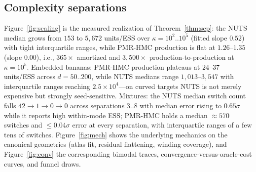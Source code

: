 \documentclass[11pt]{article}
\theoremstyle{remark}
\begin{document}
\subsection{Complexity separations}
Figure~\ref{fig:scaling} is the measured realization of
Theorem~\ref{thm:sep}: the NUTS median grows from $153$ to $5{,}672$
units/ESS over $\kappa=10^2..10^5$ (fitted slope $0.52$) with tight
interquartile ranges, while PMR-HMC production is flat at $1.26$--$1.35$
(slope $0.00$), i.e., $365\times$ amortized and $3{,}500\times$
production-to-production at $\kappa=10^5$. Embedded bananas: PMR-HMC
production plateaus at $24$--$37$ units/ESS across $d=50..200$, while
NUTS medians range $1{,}013$--$3{,}547$ with interquartile ranges
reaching $2.5\times10^4$---on curved targets NUTS is not merely
expensive but strongly seed-sensitive. Mixtures: the NUTS median switch count falls $42\to1\to0\to0$ across
separations $3..8$ with median error rising to $0.65\sigma$ while it
reports high within-mode
ESS; PMR-HMC holds a median $\approx570$ switches and
$\le0.04\sigma$ error at every separation, with interquartile ranges of
a few tens of switches. Figure~\ref{fig:mech} shows the underlying
mechanics on the canonical geometries (atlas fit, residual
flattening, winding coverage), and Figure~\ref{fig:conv} the
corresponding bimodal traces, convergence-versus-oracle-cost curves,
and funnel draws.
\end{document}
